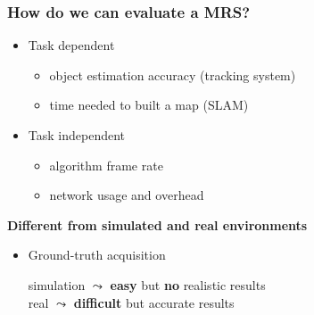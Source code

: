 \begin{frame}
	\frametitle{How do we can evaluate a MRS?}
	
	\Large
	
	\begin{itemize}
		\item Task dependent
		
		\begin{itemize}
			\normalsize
			
			\item object estimation accuracy (tracking system)
			
			\item time needed to built a map (SLAM)
		\end{itemize}
		
		\item Task independent
		
		\begin{itemize}
			\normalsize
			
			\item algorithm frame rate
			
			\item network usage and overhead
		\end{itemize}
	\end{itemize}
	
	\textbf{Different from simulated and real environments}	
	
	\begin{itemize}
		\normalsize
		
		\item Ground-truth acquisition\\
		
		\vspace{-0.2cm}
		
		\begin{tabbing}
			\hspace*{0.3cm}
			simulation $ \leadsto $ \textbf{easy} but \textbf{no} realistic results\\
			
			\hspace*{0.3cm}
			real $ \leadsto $ \textbf{difficult} but accurate results
		\end{tabbing}
	\end{itemize}
\end{frame}

